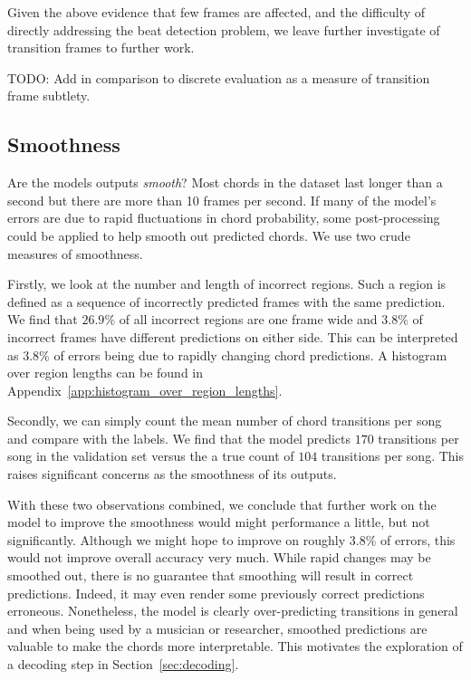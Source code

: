 Given the above evidence that few frames are affected, and the difficulty of directly addressing the beat detection problem, we leave further investigate of transition frames to further work.

TODO: Add in comparison to discrete evaluation as a measure of transition frame subtlety.


\subsection{Smoothness}\label{sec:smoothness}

Are the models outputs \emph{smooth}? Most chords in the dataset last longer than a second but there are more than 10 frames per second. If many of the model's errors are due to rapid fluctuations in chord probability, some post-processing could be applied to help smooth out predicted chords. We use two crude measures of smoothness.

Firstly, we look at the number and length of incorrect regions. Such a region is defined as a sequence of incorrectly predicted frames with the same prediction. We find that $26.9\%$ of all incorrect regions are one frame wide and $3.8\%$ of incorrect frames have different predictions on either side. This can be interpreted as $3.8\%$ of errors being due to rapidly changing chord predictions. A histogram over region lengths can be found in Appendix~\ref{app:histogram_over_region_lengths}.

Secondly, we can simply count the mean number of chord transitions per song and compare with the labels. We find that the model predicts $170$ transitions per song in the validation set versus the a true count of $104$ transitions per song. This raises significant concerns as the smoothness of its outputs. 

With these two observations combined, we conclude that further work on the model to improve the smoothness would might performance a little, but not significantly. Although we might hope to improve on roughly $3.8\%$ of errors, this would not improve overall accuracy very much. While rapid changes may be smoothed out, there is no guarantee that smoothing will result in correct predictions. Indeed, it may even render some previously correct predictions erroneous. Nonetheless, the model is clearly over-predicting transitions in general and when being used by a musician or researcher, smoothed predictions are valuable to make the chords more interpretable. This motivates the exploration of a decoding step in Section~\ref{sec:decoding}.

